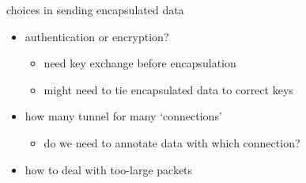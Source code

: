 


\begin{frame}{choices in sending encapsulated data}
\begin{itemize}
\item authentication or encryption?
    \begin{itemize}
    \item need key exchange before encapsulation
    \item might need to tie encapsulated data to correct keys
    \end{itemize}
\item how many tunnel for many `connections'
    \begin{itemize}
    \item do we need to annotate data with which connection?
    \end{itemize}
\item how to deal with too-large packets
\end{itemize}
\end{frame}

